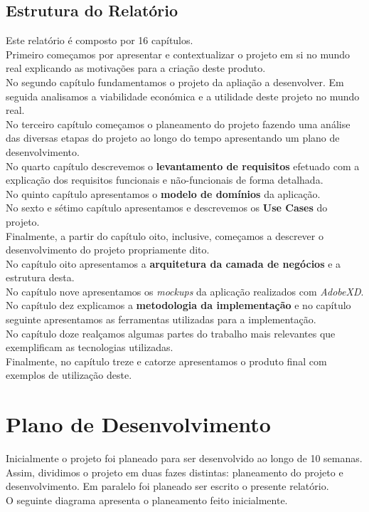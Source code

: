 \documentclass[a4paper]{report}
\begin{document}
    \section{Estrutura do Relatório}
    Este relatório é composto por 16 capítulos.\\
    Primeiro começamos por apresentar e contextualizar o projeto em si no mundo
    real explicando as motivações para a criação deste produto.\\
    No segundo capítulo fundamentamos o projeto da apliação a desenvolver. Em
    seguida analisamos a viabilidade económica e a utilidade deste projeto no
    mundo real.\\
    No terceiro capítulo começamos o planeamento do projeto fazendo uma análise
    das diversas etapas do projeto ao longo do tempo apresentando um plano de
    desenvolvimento.\\
    No quarto capítulo descrevemos o \textbf{levantamento de requisitos}
    efetuado com a explicação dos requisitos funcionais e não-funcionais de
    forma detalhada.\\
    No quinto capítulo apresentamos o \textbf{modelo de domínios} da
    aplicação.\\
    No sexto e sétimo capítulo apresentamos e descrevemos os \textbf{Use Cases}
    do projeto.\\
    Finalmente, a partir do capítulo oito, inclusive, começamos a descrever o
    desenvolvimento do projeto propriamente dito.\\
    No capítulo oito apresentamos a \textbf{arquitetura da camada de negócios}
    e a estrutura desta.\\
    No capítulo nove apresentamos os \textit{mockups} da aplicação realizados
    com \textit{AdobeXD}.\\
    No capítulo dez explicamos a \textbf{metodologia da implementação} e no
    capítulo seguinte apresentamos as ferramentas utilizadas para a
    implementação.\\
    No capítulo doze realçamos algumas partes do trabalho mais relevantes que
    exemplificam as tecnologias utilizadas.\\
    Finalmente, no capítulo treze e catorze apresentamos o produto final com
    exemplos de utilização deste.

\chapter{Plano de Desenvolvimento}
    Inicialmente o projeto foi planeado para ser desenvolvido ao longo de 10
    semanas. Assim, dividimos o projeto em duas fazes distintas: planeamento do
    projeto e desenvolvimento. Em paralelo foi planeado ser escrito o presente
    relatório.\\
    O seguinte diagrama apresenta o planeamento feito inicialmente.
\end{document}
